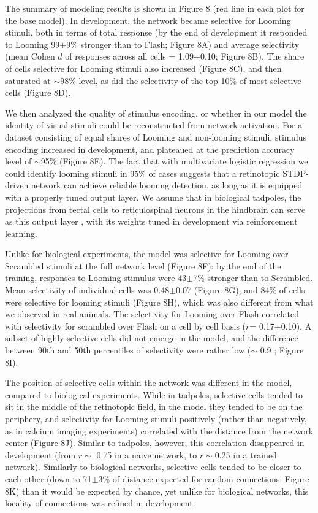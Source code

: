 \documentclass{article}
\begin{document}
The summary of modeling results is shown in Figure 8 (red line in each plot for the base model). In development, the network became selective for Looming stimuli, both in terms of total response (by the end of development it responded to Looming 99$\pm$9\% stronger than to Flash; Figure 8A) and average selectivity (mean Cohen $d$ of responses across all cells = 1.09$\pm$0.10; Figure 8B). The share of cells selective for Looming stimuli also increased (Figure 8C), and then saturated at $\sim$98\% level, as did the selectivity of the top 10\% of most selective cells (Figure 8D).

We then analyzed the quality of stimulus encoding, or whether in our model the identity of visual stimuli could be reconstructed from network activation. For a dataset consisting of equal shares of Looming and non-looming stimuli, stimulus encoding increased in development, and plateaued at the prediction accuracy level of $\sim$95\% (Figure 8E). The fact that with multivariate logistic regression we could identify looming stimuli in 95\% of cases suggests that a retinotopic STDP-driven network can achieve reliable looming detection, as long as it is equipped with a properly tuned output layer. We assume that in biological tadpoles, the projections from tectal cells to reticulospinal neurons in the hindbrain can serve as this output layer \citep{helmbrecht2018topography}, with its weights tuned in development via reinforcement learning.

Unlike for biological experiments, the model was selective for Looming over Scrambled stimuli at the full network level (Figure 8F): by the end of the training, responses to Looming stimulus were 43$\pm$7\% stronger than to Scrambled. Mean selectivity of individual cells was 0.48$\pm$0.07 (Figure 8G); and 84\% of cells were selective for looming stimuli (Figure 8H), which was also different from what we observed in real animals. The selectivity for Looming over Flash correlated with selectivity for scrambled over Flash on a cell by cell basis ($r$= 0.17$\pm$0.10). A subset of highly selective cells did not emerge in the model, and the difference between 90th and 50th percentiles of selectivity were rather low ($\sim$ 0.9 ; Figure 8I).

The position of selective cells within the network was different in the model, compared to biological experiments. While in tadpoles, selective cells tended to sit in the middle of the retinotopic field, in the model they tended to be on the periphery, and selectivity for Looming stimuli positively (rather than negatively, as in calcium imaging experiments) correlated with the distance from the network center (Figure 8J). Similar to tadpoles, however, this correlation disappeared in development (from $r\sim$ 0.75 in a naive network, to $r\sim$0.25 in a trained network). Similarly to biological networks, selective cells tended to be closer to each other (down to 71$\pm$3\% of distance expected for random connections; Figure 8K) than it would be expected by chance, yet unlike for biological networks, this locality of connections was refined in development.
\end{document}
